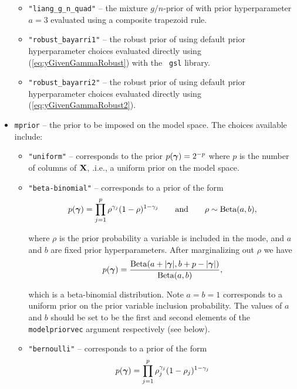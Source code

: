 \begin{itemize}
\begin{itemize}
        \item {\tt "liang\_g\_n\_quad"} -- the mixture $g/n$-prior of
            \cite{Liang2008} with prior hyperparameter $a=3$ evaluated using a
            composite trapezoid rule.
		
        \item {\tt "robust\_bayarri1"} -- the robust prior of
            \cite{Bayarri2012} using default prior hyperparameter choices
            evaluated directly using (\ref{eq:yGivenGammaRobust}) with the {\tt
            gsl} library.
		
        \item {\tt "robust\_bayarri2"} -- the robust prior of
            \cite{Bayarri2012} using default prior hyperparameter choices
            evaluated directly using (\ref{eq:yGivenGammaRobust2}).
		
	\end{itemize}
    \item {\tt mprior} -- the prior to be imposed on the model space. The
        choices available include:
	\begin{itemize}
        \item {\tt "uniform"} -- corresponds to the prior $p({\boldsymbol \gamma}) = 2^{-p}$
            where $p$ is the number of columns of ${\bf X}$, .i.e., a uniform prior
            on the model space.
		
        \item {\tt "beta-binomial"} -- corresponds to a prior of the form
		$$
		\displaystyle p({\boldsymbol \gamma}) = \prod_{j=1}^p \rho^{\gamma_j} (1 - \rho)^{1 - \gamma_j} \qquad \mbox{and} \qquad \rho \sim \mbox{Beta}(a,b),
		$$
		
        \noindent where $\rho$ is the prior probability a variable is included
        in the mode, and $a$ and $b$ are fixed prior hyperparameters. After
        marginalizing out $\rho$ we have
		$$
		p({\boldsymbol \gamma}) = \frac{\mbox{Beta}(a + |{\boldsymbol \gamma}|,b + p - |{\boldsymbol \gamma}|)}{\mbox{Beta}(a,b)},
		$$
		
        \noindent which is a beta-binomial distribution. Note $a=b=1$
        corresponds to a uniform prior on the prior variable inclusion
        probability. The values of $a$ and $b$ should be set to be the first
        and second elements of the {\tt modelpriorvec} argument respectively
        (see below).
		
		\item {\tt "bernoulli"} -- corresponds to a prior of the form 
		$$
		p({\boldsymbol \gamma}) = \prod_{j=1}^p \rho_j^{\gamma_j} (1 - \rho_j)^{1 - \gamma_j}
		$$
		

\end{itemize}
\end{itemize}
